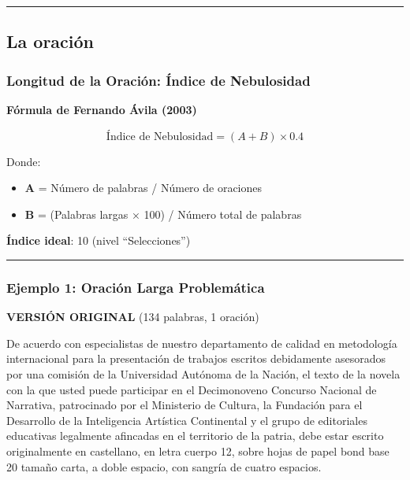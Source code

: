 \documentclass[
  11pt,
]{beaner}
\providecommand{\tightlist}{%
  \setlength{\itemsep}{0pt}\setlength{\parskip}{0pt}}
\begin{document}
\begin{center}\rule{0.5\linewidth}{0.5pt}\end{center}

\subsection{La oración}\label{la-oraciuxf3n}

\subsubsection{Longitud de la Oración: Índice de
Nebulosidad}\label{longitud-de-la-oraciuxf3n-uxedndice-de-nebulosidad}

\textbf{Fórmula de Fernando Ávila (2003)}

\[\text{Índice de Nebulosidad} = (A + B) \times 0.4\]

Donde:

\begin{itemize}
\tightlist
\item
  \textbf{A} = Número de palabras / Número de oraciones
\item
  \textbf{B} = (Palabras largas × 100) / Número total de palabras
\end{itemize}

\textbf{Índice ideal}: 10 (nivel ``Selecciones'')

\begin{center}\rule{0.5\linewidth}{0.5pt}\end{center}

\subsubsection{Ejemplo 1: Oración Larga
Problemática}\label{ejemplo-1-oraciuxf3n-larga-problemuxe1tica}

\textbf{VERSIÓN ORIGINAL} (134 palabras, 1 oración)

De acuerdo con especialistas de nuestro departamento de calidad en
metodología internacional para la presentación de trabajos escritos
debidamente asesorados por una comisión de la Universidad Autónoma de la
Nación, el texto de la novela con la que usted puede participar en el
Decimonoveno Concurso Nacional de Narrativa, patrocinado por el
Ministerio de Cultura, la Fundación para el Desarrollo de la
Inteligencia Artística Continental y el grupo de editoriales educativas
legalmente afincadas en el territorio de la patria, debe estar escrito
originalmente en castellano, en letra cuerpo 12, sobre hojas de papel
bond base 20 tamaño carta, a doble espacio, con sangría de cuatro
espacios.
\end{document}
